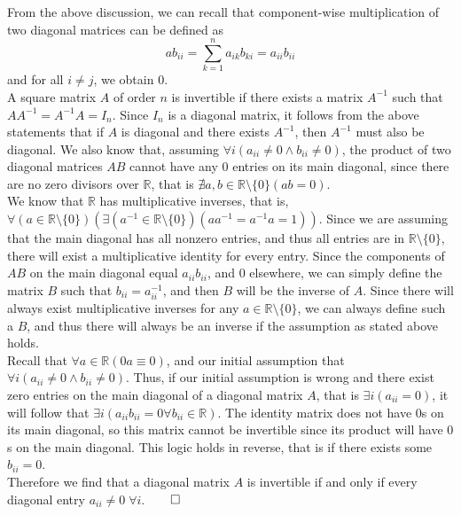 \documentclass{article}
\begin{document}
From the above discussion, we can recall that component-wise multiplication of two diagonal matrices can be defined as 
\[
    ab_{ii} =\sum_{k=1}^n a_{ik}b_{ki} =a_{ii}b_{ii}
\]
and for all \(i\neq j\), we obtain \(0\).\\
A square matrix \(A\) of order \(n\)  is invertible if there exists a matrix \(A^{-1} \) such that \(AA^{-1} =A^{-1} A=I_n\). Since \(I_n\) is a diagonal matrix, it follows from the above statements that if \(A\) is diagonal and there exists \(A^{-1} \), then \(A^{-1} \) must also be diagonal. We also know that, assuming \(\forall i(a_{ii}\neq0\land b_{ii}\neq 0 )\), the product of two diagonal matrices \(AB\) cannot have any 0 entries on its main diagonal, since there are no zero divisors over \(\mathbb{R} \), that is \(\nexists a,b\in\mathbb{R}\setminus \{ 0 \}  (ab=0)\).\\
We know that \(\mathbb{R} \) has multiplicative inverses, that is, \(\forall( a\in\mathbb{R}\setminus \{ 0 \}  )(\exists( a^{-1} \in\mathbb{R}\setminus \{ 0 \}  )(aa^{-1} =a^{-1} a=1))\). Since we are assuming that the main diagonal has all nonzero entries, and thus all entries are in \(\mathbb{R} \setminus \{ 0 \} \), there will exist a multiplicative identity for every entry. Since the components of \(AB\) on the main diagonal equal \(a_{ii}b_{ii}  \), and \(0\) elsewhere, we can simply define the matrix \(B\) such that \(b_{ii}=a^{-1}_{ii}  \), and then \(B\) will be the inverse of \(A\). Since there will always exist multiplicative inverses for any \(a\in\mathbb{R} \setminus \{ 0 \} \), we can always define such a \(B\), and thus there will always be an inverse if the assumption as stated above holds.\\
Recall that \(\forall a\in\mathbb{R} (0a\equiv 0)\), and our initial assumption that \(\forall i(a_{ii}\neq 0\land b_{ii}\neq0  )\). Thus, if our initial assumption is wrong and there exist zero entries on the main diagonal of a diagonal matrix \(A\), that is \(\exists i( a_{ii}=0) \), it will follow that \(\exists i(a_{ii}b_{ii}=0\forall b_{ii}\in\mathbb{R})   \). The identity matrix does not have \(0\)s on its main diagonal, so this matrix cannot be invertible since its product will have \(0\)s on the main diagonal. This logic holds in reverse, that is if there exists some \(b_{ii}=0 \).\\
Therefore we find that a diagonal matrix \(A\) is invertible if and only if every diagonal entry \(a_{ii}\neq0\;\forall i\).\hfill\(\qed\) 
\end{document}
